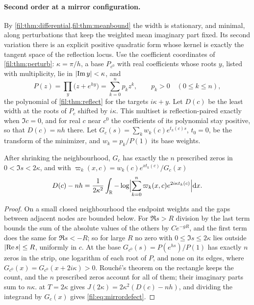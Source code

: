 \paragraph{Second order at a mirror configuration.}
By \cref{fil:thm:differential,fil:thm:meanbound} the width is stationary, and minimal, along perturbations
that keep the weighted mean imaginary part fixed. Its second variation there is an explicit positive
quadratic form whose kernel is exactly the tangent space of the reflection locus. Use the coefficient
coordinates of \cref{fil:thm:perturb}: $\kappa=\pi/h$, a base $P_{c^0}$ with real coefficients whose roots $y$,
listed with multiplicity, lie in $\lvert\operatorname{Im} y\rvert<\kappa$, and
\[
 P(z)=\prod_y\bigl(z+e^{hy}\bigr)=\sum_{k=0}^np_kz^k,\qquad p_k>0\quad(0\le k\le n),
\]
the polynomial of \cref{fil:thm:reflect} for the targets $i\kappa+y$. Let $D(c)$ be the least width at the
roots of $P_c$ shifted by $i\kappa$. This multiset is reflection-paired exactly when $\Im c=0$, and for real $c$
near $c^0$ the coefficients of its polynomial stay positive, so that $D(c)=nh$ there. Let
$G_c(s)=\sum_kw_k(c)e^{t_k(c)s}$, $t_0=0$, be the transform of the minimizer, and $w_k=p_k/P(1)$ its base weights.

\begin{lemma}\label{fil:lem:mirrordefect}
After shrinking the neighbourhood, $G_c$ has exactly the $n$ prescribed zeros in $0<\Im s<2\kappa$, and with
$\varpi_k(x,c)=w_k(c)e^{xt_k(c)}/G_c(x)$
\begin{equation}\label{fil:eq:mirrordefect}
 D(c)-nh=\frac1{2\kappa^2}\int_{\mathbb{R}}-\log\Bigl\lvert\sum_{k=0}^n\varpi_k(x,c)e^{2i\kappa t_k(c)}\Bigr\rvert\mathrm{d} x .
\end{equation}
\end{lemma}

\begin{proof}
On a small closed neighbourhood the endpoint weights and the gaps between adjacent nodes are bounded below.
For $\Re s>R$ division by the last term bounds the sum of the absolute values of the others by $Ce^{-gR}$, and
the first term does the same for $\Re s<-R$; so for large $R$ no zero with $0\le\Im s\le2\kappa$ lies outside
$\lvert\operatorname{Re} s\rvert\le R$, uniformly in $c$. At the base $G_{c^0}(s)=P(e^{hs})/P(1)$ has exactly $n$ zeros in the strip,
one logarithm of each root of $P$, and none on its edges, where $G_{c^0}(x)=G_{c^0}(x+2i\kappa)>0$. Rouch\'e's
theorem on the rectangle keeps the count, and the $n$ prescribed zeros account for all of them; their imaginary
parts sum to $n\kappa$.  at $T=2\kappa$ gives $J(2\kappa)=2\kappa^2(D(c)-nh)$, and dividing the
integrand by $G_c(x)$ gives \eqref{fil:eq:mirrordefect}.
\end{proof}

